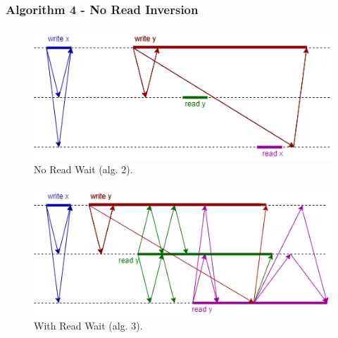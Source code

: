 \begin{frame}
    \frametitle{Algorithm 4 - No Read Inversion}
    \begin{center}
        \begin{figure}
            \includegraphics[scale=.35]{resources/alg2_incorrectness.png}
            \caption*{No Read Wait (alg. 2).}
        \end{figure}
        \begin{figure}
            \includegraphics[scale=.35]{resources/alg3_no_read_inversion.png}
            \caption*{With Read Wait (alg. 3).}
        \end{figure}
    \end{center}
\end{frame}